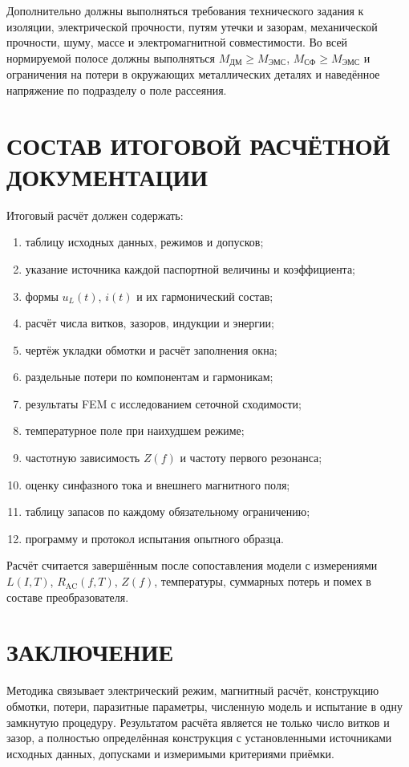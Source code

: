 \documentclass[14pt,a4paper]{extarticle}
\begin{document}
Дополнительно должны выполняться требования технического задания к
изоляции, электрической прочности, путям утечки и зазорам, механической
прочности, шуму, массе и электромагнитной совместимости. Во всей
нормируемой полосе должны выполняться
$M_{\text{ДМ}}\geq M_{\text{ЭМС}}$,
$M_{\text{СФ}}\geq M_{\text{ЭМС}}$ и ограничения на потери в окружающих
металлических деталях и наведённое напряжение по
подразделу о поле рассеяния.

\section{СОСТАВ ИТОГОВОЙ РАСЧЁТНОЙ ДОКУМЕНТАЦИИ}

Итоговый расчёт должен содержать:
\begin{enumerate}
 \item таблицу исходных данных, режимов и допусков;
 \item указание источника каждой паспортной величины и коэффициента;
 \item формы $u_L(t)$, $i(t)$ и их гармонический состав;
 \item расчёт числа витков, зазоров, индукции и энергии;
 \item чертёж укладки обмотки и расчёт заполнения окна;
 \item раздельные потери по компонентам и гармоникам;
 \item результаты FEM с исследованием сеточной сходимости;
 \item температурное поле при наихудшем режиме;
 \item частотную зависимость $Z(f)$ и частоту первого резонанса;
 \item оценку синфазного тока и внешнего магнитного поля;
 \item таблицу запасов по каждому обязательному ограничению;
 \item программу и протокол испытания опытного образца.
\end{enumerate}

Расчёт считается завершённым после сопоставления модели с измерениями
$L(I,T)$, $R_{\text{AC}}(f,T)$, $Z(f)$, температуры, суммарных потерь и
помех в составе преобразователя.

\section{ЗАКЛЮЧЕНИЕ}

Методика связывает электрический режим, магнитный расчёт, конструкцию
обмотки, потери, паразитные параметры, численную модель и испытание в одну
замкнутую процедуру. Результатом расчёта является не только число витков и
зазор, а полностью определённая конструкция с установленными источниками
исходных данных, допусками и измеримыми критериями приёмки.
\end{document}
